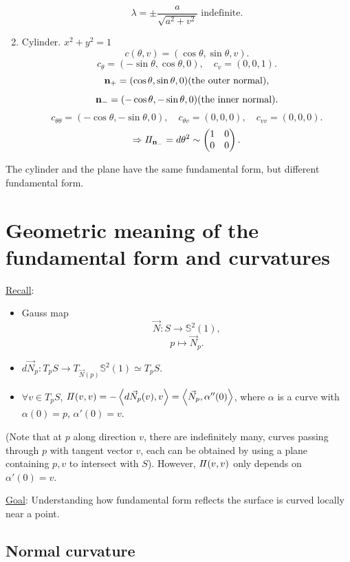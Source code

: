 \begin{example}
\begin{enumerate}[(1)]
\[        \lambda=\pm \frac{a}{\sqrt{a^2+v^2}}\text{ indefinite}.
    \]
    \item Cylinder. \(x^2+y^2=1\)
    \[
        c(\theta,v)=(\cos \theta,\sin\theta,v).    
    \]
    \[
        c_\theta=(-\sin \theta,\cos \theta,0),\quad
        c_v=(0,0,1).    
    \]
    \[
        \vb{n}_+=(\cos\theta,\sin\theta,0)(\text{the outer normal}),    
    \]
    \[
        \vb{n}_-=(-\cos\theta,-\sin\theta,0)(\text{the inner normal}).
    \]
    \[
        c_{\theta\theta}=(-\cos \theta,-\sin\theta,0),\quad
        c_{\theta v}=(0,0,0),\quad
        c_{vv}=(0,0,0).    
    \]
    \[\Rightarrow I\!I_{\vb{n}_-}=d \theta^2\sim \begin{pmatrix}
        1&0\\0&0
    \end{pmatrix}.\]
    \end{enumerate}  
\end{example}
\begin{remark}
    The cylinder and the plane have the same  fundamental
    form, but different  fundamental form.
\end{remark}
\section{Geometric meaning of the \texorpdfstring{}{2nd} fundamental form and curvatures}
\underline{Recall}: \begin{itemize}
    \item Gauss map \[\vec{N}\colon S\to \mathbb{S}^2(1),\]
    \[p\mapsto \vec{N}_p.\]
    \item \(d \vec{N}_p\colon T_p S\to T_{\vec{N}(p)}\mathbb{S}^2(1)
    \simeq T_p S\).
    \item \(\forall v \in T_p S\), \(I\!I(v,v)=-\left\langle d 
    \vec{N}_p(v),v
    \right\rangle=\left\langle \vec{N}_p,
    \alpha''(0)\right\rangle\), where
    \(\alpha\) is a curve with \(\alpha(0)=p\), \(\alpha'(0)=v\).
\end{itemize}
(Note that at \(p\) along direction \(v\), there are indefinitely
many, curves passing through \(p\) with tangent vector \(v\), each
can be obtained by using a plane containing \(p,v\) to intersect with
\(S\)). However, \(I\!I(v,v)\) only depends on \(\alpha'(0)=v\).

\underline{Goal}: Understanding how  fundamental 
form reflects the surface is curved locally near a point.
\subsection{Normal curvature}
    
